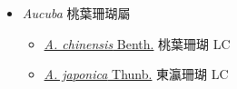 
  \begin{itemize}
 \item[] \textit{Aucuba} 桃葉珊瑚屬
                    
  \begin{itemize}
        \item[] \href{http://www.theplantlist.org/tpl1.1/search?q=Aucuba+chinensis}{\textit{A. chinensis} Benth.}   桃葉珊瑚 LC
        \item[] \href{http://www.theplantlist.org/tpl1.1/search?q=Aucuba+japonica}{\textit{A. japonica} Thunb.}   東瀛珊瑚 LC
  \end{itemize}
  \end{itemize}
